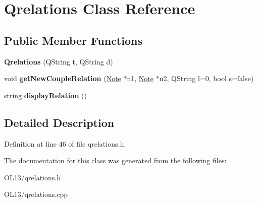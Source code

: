 \hypertarget{class_qrelations}{}\section{Qrelations Class Reference}
\label{class_qrelations}
\subsection*{Public Member Functions}
\begin{DoxyCompactItemize}
\item 
\mbox{\label{class_qrelations_a72cdb149d1aca6aadd2c69af35fd6327}} 
{\bfseries Qrelations} (Q\+String t, Q\+String d)
\item 
\mbox{\label{class_qrelations_a5811cf8d362be772d2891fce3b821e97}} 
void {\bfseries get\+New\+Couple\+Relation} (\hyperlink{class_note}{Note} $\ast$n1, \hyperlink{class_note}{Note} $\ast$n2, Q\+String l=0, bool s=false)
\item 
\mbox{\label{class_qrelations_ab8ae416ea63621095fa90508f795b80e}} 
string {\bfseries display\+Relation} ()
\end{DoxyCompactItemize}


\subsection{Detailed Description}


Definition at line 46 of file qrelations.\+h.



The documentation for this class was generated from the following files\+:\begin{DoxyCompactItemize}
\item 
O\+L13/qrelations.\+h\item 
O\+L13/qrelations.\+cpp\end{DoxyCompactItemize}

